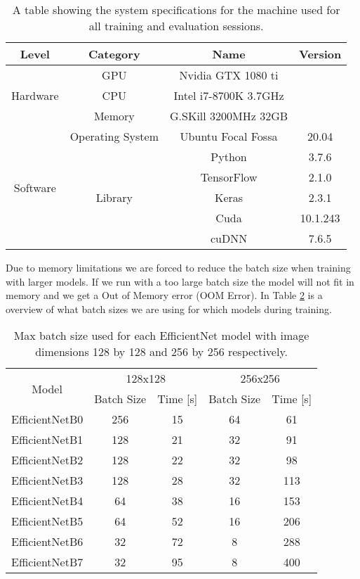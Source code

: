 \documentclass[thesis.tex]{subfiles}
\begin{document}
\begin{table} %
  \centering
  \renewcommand{\arraystretch}{1.3}
  \begin{tabular}{|c|c|c|c|}
  \hline
  Level		& Category		& Name		& Version \\
  \hline
  \multirow{3}{*}{Hardware} & GPU & Nvidia GTX 1080 ti & \\
  \cline{2-4}
  & CPU & Intel i7-8700K 3.7GHz & \\
  \cline{2-4}
  & Memory & G.SKill 3200MHz 32GB & \\
  \hline
  \multirow{6}{*}{Software} & Operating System & Ubuntu Focal Fossa & 20.04 \\
  \cline{2-4}
  & \multirow{5}{*}{Library} & Python & 3.7.6 \\
  \cline{3-4}
  & & TensorFlow & 2.1.0 \\
  \cline{3-4}
  & & Keras & 2.3.1 \\
  \cline{3-4}
  & & Cuda & 10.1.243 \\
  \cline{3-4}
  & & cuDNN & 7.6.5 \\
  \hline
  \end{tabular}
  \caption[System specifications]{A table showing the system specifications for the machine used for all training and evaluation sessions.}
  \label{table:system_specs}
\end{table}

Due to memory limitations we are forced to reduce the batch size when training with larger models. If we run with a too large batch size the model will not fit in memory and we get a Out of Memory error (OOM Error). In Table \ref{table:model_bs} is a overview of what batch sizes we are using for which models during training.

\begin{table} %
  \centering
  \begin{tabular}{|c|cc|cc|}
	\hline
	\multirow{2}{*}{Model} & \multicolumn{2}{c|}{128x128} & \multicolumn{2}{c|}{256x256} \\
	\cline{2-5}
	& Batch Size & Time [s] & Batch Size & Time [s] \\
	\hline
	EfficientNetB0 & 256 & 15 	& 64  & 61  \\
	EfficientNetB1 & 128 & 21	& 32  & 91  \\
	EfficientNetB2 & 128 & 22	& 32  & 98  \\
 	EfficientNetB3 & 128 & 28	& 32  & 113 \\
  	EfficientNetB4 & 64  & 38	& 16  & 153 \\
  	EfficientNetB5 & 64  & 52	& 16  & 206 \\
  	EfficientNetB6 & 32  & 72	& 8   & 288 \\
  	EfficientNetB7 & 32  & 95	& 8   & 400 \\
  	\hline
  \end{tabular}
  \caption[Max batch size for each EfficientNet model]{Max batch size used for each EfficientNet model with image dimensions 128 by 128 and 256 by 256 respectively.}
  \label{table:model_bs}
\end{table}
\end{document}
